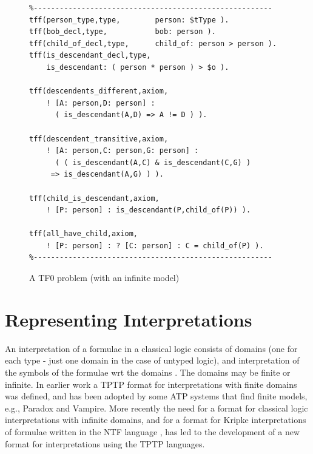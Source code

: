 \documentclass[letterpaper]{article}
\begin{document}
\begin{figure}[htbp]
\scriptsize
{}
\begin{verbatim}
%-------------------------------------------------------
tff(person_type,type,        person: $tType ).
tff(bob_decl,type,           bob: person ).
tff(child_of_decl,type,      child_of: person > person ).
tff(is_descendant_decl,type, 
    is_descendant: ( person * person ) > $o ).

tff(descendents_different,axiom,
    ! [A: person,D: person] : 
      ( is_descendant(A,D) => A != D ) ).

tff(descendent_transitive,axiom,
    ! [A: person,C: person,G: person] :
      ( ( is_descendant(A,C) & is_descendant(C,G) ) 
     => is_descendant(A,G) ) ).

tff(child_is_descendant,axiom,
    ! [P: person] : is_descendant(P,child_of(P)) ).

tff(all_have_child,axiom,
    ! [P: person] : ? [C: person] : C = child_of(P) ).
%-------------------------------------------------------
\end{verbatim}
\caption{A TF0 problem (with an infinite model)}
\label{TF0InfiniteProblem}
\end{figure}


\section{Representing Interpretations}
\label{Interpretations}

An interpretation of a formulae in a classical logic consists of domains (one for each type -
just one domain in the case of untyped logic), and interpretation of the symbols of the 
formulae wrt the domains \cite{Hun96}.
The domains may be finite or infinite.
In earlier work \cite{SS+06} a TPTP format for interpretations with finite domains was defined,
and has been adopted by some ATP systems that find finite models, e.g., Paradox and Vampire.
More recently the need for a format for classical logic interpretations with infinite domains,
and for a format for Kripke interpretations \cite{Kri63} of formulae written in the NTF language
\cite{SF+22}, has led to the development of a new format for interpretations using the TPTP 
languages.
\end{document}

